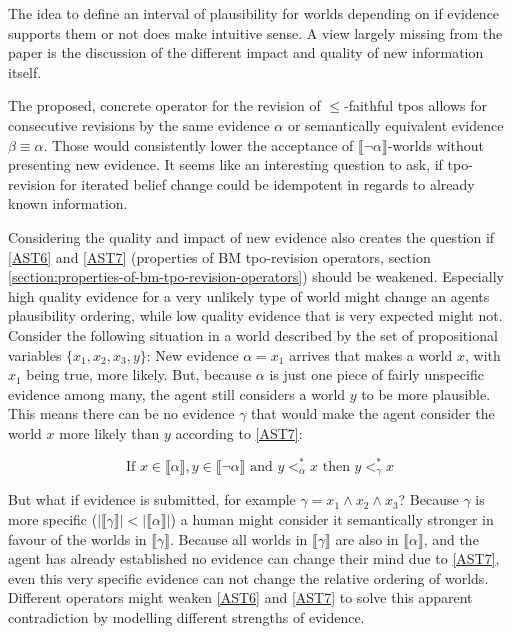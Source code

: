 \documentclass[english, 12pt]{scrartcl}
\theoremstyle{definition}
\theoremstyle{definition}
\theoremstyle{definition}
\newcommand{\modelsOf}[1]{\llbracket #1 \rrbracket}
\begin{document}
The idea to define an interval of plausibility for worlds depending on if evidence supports them or not does make intuitive sense. A view largely missing from the paper is the discussion of the different impact and quality of new information itself.

The proposed, concrete operator for the revision of $\leq$-faithful tpos allows for consecutive revisions by the same evidence $\alpha$ or semantically equivalent evidence $\beta \equiv \alpha$. Those would consistently lower the acceptance of $\modelsOf{\neg\alpha}$-worlds without presenting new evidence. It seems like an interesting question to ask, if tpo-revision for iterated belief change could be idempotent in regards to already known information.

Considering the quality and impact of new evidence also creates the question if \ref{AST6} and \ref{AST7} (properties of BM tpo-revision operators, section \ref{section:properties-of-bm-tpo-revision-operators}) should be weakened. Especially high quality evidence for a very unlikely type of world might change an agents plausibility ordering, while low quality evidence that is very expected might not.
Consider the following situation in a world described by the set of propositional variables $\{x_1, x_2, x_3, y\}$: New evidence $\alpha = x_1$ arrives that  makes a world $x$, with $x_1$ being true, more likely. But, because $\alpha$ is just one piece of fairly unspecific evidence among many, the agent still considers a world $y$ to be more plausible. This means there can be no evidence $\gamma$ that would make the agent consider the world $x$ more likely than $y$ according to \ref{AST7}:

\begin{equation*}
    \textrm{If } x \in \modelsOf{\alpha}, y \in \modelsOf{\neg\alpha} \textrm{ and } y <_{\alpha}^{\ast} x \textrm{ then } y <_{\gamma}^{\ast} x
\end{equation*}

But what if evidence is submitted, for example $\gamma = x_1 \wedge x_2 \wedge x_3$? Because $\gamma$ is more specific ($|\modelsOf{\gamma}| <  |\modelsOf{\alpha}|$) a human might consider it semantically stronger in favour of the worlds in $\modelsOf{\gamma}$. Because all worlds in $\modelsOf{\gamma}$ are also in $\modelsOf{\alpha}$, and the agent has already established no evidence can change their mind due to \ref{AST7}, even this very specific evidence can not change the relative ordering of worlds. Different operators might weaken \ref{AST6} and \ref{AST7} to solve this apparent contradiction by modelling different strengths of evidence.

\newpage

\typeout{}


\end{document}
